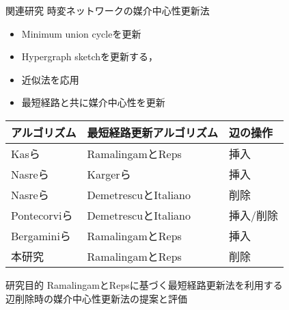 \documentclass[dvipdfmx,fleqn]{beamer}
\begin{document}
\begin{frame}{関連研究}
  時変ネットワークの媒介中心性更新法
  \begin{itemize}\small
  \item Minimum union cycleを更新\cite{19Lee2012,20Singh2015}
  \item Hypergraph sketch\cite{17Yoshida2014}を更新する\cite{21Hayashi2015}，
  \item 近似法を応用\cite{22Bergamini2015a,23Bergamini2015b}
  \item \alert{最短経路と共に媒介中心性を更新}
  \end{itemize}
  \begin{center}
    \scriptsize
    \begin{tabular}{lll}
      \hline
      アルゴリズム & 最短経路更新アルゴリズム & 辺の操作 \\ \hline
      Kasら\cite{25Kas2013} & RamalingamとReps\cite{24Ramalingam1996} & 挿入 \\ \hline
      Nasreら\cite{27Nasre2014a} & Kargerら\cite{26Karger1993} & 挿入 \\ \hline
      Nasreら\cite{29Nasre2014b} & DemetrescuとItaliano\cite{28Demetrescu2003} & 削除 \\ \hline
      Pontecorviら\cite{30Pontecorvi2015} & DemetrescuとItaliano\cite{28Demetrescu2003} & 挿入/削除 \\ \hline
      Bergaminiら\cite{31Bergamini2017} & RamalingamとReps\cite{24Ramalingam1996} & 挿入 \\ \hline
      \alert{本研究} & \alert{RamalingamとReps}\cite{24Ramalingam1996} & \alert{削除} \\ \hline
    \end{tabular}
  \end{center}
  \begin{block}{研究目的}
    \small
    RamalingamとRepsに基づく最短経路更新法を利用する \\
    辺削除時の媒介中心性更新法の提案と評価
  \end{block}
\end{frame}
  
\end{document}
